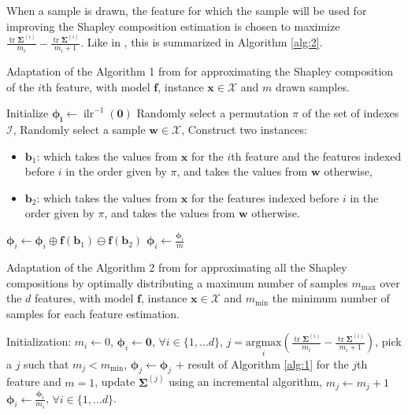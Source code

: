 \documentclass{article}
\theoremstyle{plain}
\theoremstyle{definition}
\theoremstyle{remark}
\DeclareMathOperator{\ilr}{ilr}
\DeclareMathOperator{\tr}{tr}
\begin{document}
When a sample is drawn, the feature for which the sample will be used for improving the Shapley composition estimation is chosen to maximize $\frac{\tr \bm{\Sigma}^{(i)}}{m_i} - \frac{\tr \bm{\Sigma}^{(i)}}{m_i+1}$. Like in \cite{vstrumbelj2014explaining}, this is summarized in Algorithm \ref{alg:2}.
\begin{algorithm}
   \caption{Adaptation of the Algorithm 1 from \cite{vstrumbelj2014explaining} for approximating the Shapley composition of the $i$th feature, with model $\bm{f}$, instance $\bm{x}\in\mathcal{X}$ and $m$ drawn samples.}
   \label{alg:1}
\begin{algorithmic}
   \STATE Initialize $\bm{\phi_i}\leftarrow \ilr^{-1}(\bm{0})$
   \STATE Randomly select a permutation $\pi$ of the set of indexes $\mathcal{I}$,
   \STATE Randomly select a sample $\bm{w}\in\mathcal{X}$,
   \STATE Construct two instances:
   \begin{itemize}
     \item $\bm{b}_1$: which takes the values from $\bm{x}$ for the $i$th feature and the features indexed before $i$ in the order given by $\pi$, and takes the values from $\bm{w}$ otherwise,
     \item $\bm{b}_2$: which takes the values from $\bm{x}$ for the features indexed before $i$ in the order given by $\pi$, and takes the values from $\bm{w}$ otherwise.
     \end{itemize}
   \STATE $\bm{\phi}_i \leftarrow \bm{\phi}_i \oplus \bm{f}(\bm{b}_1) \ominus \bm{f}(\bm{b}_2) $
   \ENDFOR
   \STATE $\bm{\phi}_i \leftarrow \frac{\bm{\phi}_i}{m}$
\end{algorithmic}
\end{algorithm}

\begin{algorithm}
   \caption{Adaptation of the Algorithm 2 from \cite{vstrumbelj2014explaining} for approximating all the Shapley compositions by optimally distributing a maximum number of samples $m_{\text{max}}$ over the $d$ features, with model $\bm{f}$, instance $\bm{x}\in\mathcal{X}$ and $m_{\text{min}}$ the minimum number of samples for each feature estimation.}
   \label{alg:2}
   \begin{algorithmic}
     \STATE Initialization: $m_{i} \leftarrow 0$, $\bm{\phi}_i \leftarrow \bm{0}$, $\forall i \in \{1, \dots d\}$,
     \STATE $j = \underset{i}{\text{argmax}} \left( \frac{\tr \bm{\Sigma}^{(i)}}{m_i} - \frac{\tr \bm{\Sigma}^{(i)}}{m_i+1} \right)$,
     \ELSE
     \STATE pick a $j$ such that $m_j < m_{\text{min}}$,
     \ENDIF
     \STATE $\bm{\phi}_j \leftarrow \bm{\phi}_j$ $+$ result of Algorithm \ref{alg:1} for the $j$th feature and $m=1$,
     \STATE update $\bm{\Sigma}^{(j)}$ using an incremental algorithm,
     \STATE $m_j \leftarrow m_j+1$
     \ENDWHILE
     \STATE $\bm{\phi}_i \leftarrow \frac{\bm{\phi}_i}{m_i}$, $\forall i \in \{1, \dots d\}$.
\end{algorithmic}
\end{algorithm}
\end{document}
